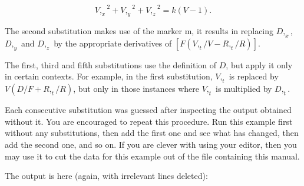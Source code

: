 $$ {V,_x}^2 + {V,_y}^2 + {V,_z}^2   = k (V - 1). $$

\noindent The second substitution  makes  use  of  the  marker  m,  it results
in replacing $D,_x$, $D,_y$ and $D,_z$ by  the  appropriate derivatives of $[F
(V,_t / V - R,_t / R)]$.

The  first,  third  and  fifth  substitutions  use  the definition of $D$, but
apply it only in certain contexts.  For example, in the  first  substitution,
$V,_t$ is  replaced  by $V (D / F + R,_t / R)$, but only in those instances
where $V,_t$ is multiplied by $D,_t$.

Each  consecutive  substitution   was   guessed   after
     inspecting  the  output  obtained  without   it.   You   are
     encouraged to repeat this procedure. Run this example  first
     without any substitutions, then add the first  one  and  see
     what has changed, then add the second one, and so on. If you
     are clever with using your editor, then you may  use  it  to
     cut the data for this example out of the file containing
      this manual.

The output is here (again, with irrelevant lines deleted):

\bigskip

